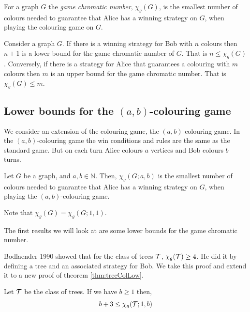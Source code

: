 \begin{definition}
    For a graph $G$ the \textit{game chromatic number}, $\chi_g(G)$, is the smallest number of colours needed to guarantee that Alice has a winning strategy on $G$, when playing the colouring game on $G$.     
\end{definition}

Consider a graph $G$. If there is a winning strategy for Bob with $n$ colours then $n+1$ is a lower bound for the game chromatic number of $G$. That is $n\leq\chi_g(G)$. Conversely, if there is a strategy for Alice that guarantees a colouring with $m$ colours then $m$ is an upper bound for the game chromatic number. That is $\chi_g(G)\leq m$. 

\subsection{Lower bounds for the $(a,b)$-colouring game}

We consider an extension of the colouring game, the $(a,b)$-colouring game. In the $(a,b)$-colouring game the win conditions and rules are the same as the standard game. But on each turn Alice colours $a$ vertices and Bob colours $b$ turns.
\begin{definition}
    Let $G$ be a graph, and $a,b\in\mathbb{N}$. 
    Then, $\chi_g(G;a,b)$ is the smallest number of colours needed to guarantee that Alice has a winning strategy on $G$, when playing the $(a,b)$-colouring game. 
\end{definition}
Note that $\chi_g(G) = \chi_g(G;1,1)$.

The first results we will look at are some lower bounds for the game chromatic number.

Bodlaender 1990 \cite{bodlander1990} showed that for the class of trees $\mathcal{T}$,  $\chi_g(\mathcal{T}) \geq 4$. He did it by defining a tree and an associated strategy for Bob. We take this proof and extend it to a new proof of theorem \ref{thm:treeColLow}. 

\begin{theorem}\label{thm:treeColLow} %
    Let $\mathcal{T}$ be the class of trees. If we have $b \geq 1$  then,
    \[b+3 \leq \chi_g(\mathcal{T};1,b)\]
\end{theorem}

